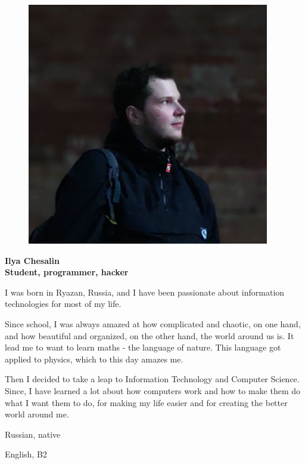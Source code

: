 \begin{figure}
	\hfill
	\includegraphics[width=0.6\columnwidth]{photo}
	\vspace{-7cm}
\end{figure}

\begin{flushright}\small

\end{flushright}\normalsize
\framebreak


\Huge\bfseries {{\color{Cyan} Ilya} {\color{Black} Chesalin}} \\
\Large\bfseries Student, programmer, hacker \\

\normalsize\normalfont

I was born in Ryazan, Russia, and I have been passionate about information
technologies for most of my life.

Since school, I was always amazed at how complicated and chaotic, on one hand, and how beautiful and organized, on the other hand, the world around us is. It lead me to want to learn maths - the language of nature. This language got applied to physics, which to this day amazes me.

Then I decided to take a leap to Information Technology and Computer Science. Since, I have learned a lot about how computers work and how to make them do what I want them to do, for making my life easier and for creating the better world around me.

\Sep


\begin{multicols}{3}
\begin{compactitem}[\color{Cyan}$\circ$]
    \item Russian, native
    \item English, B2
\end{compactitem}
\end{multicols}

